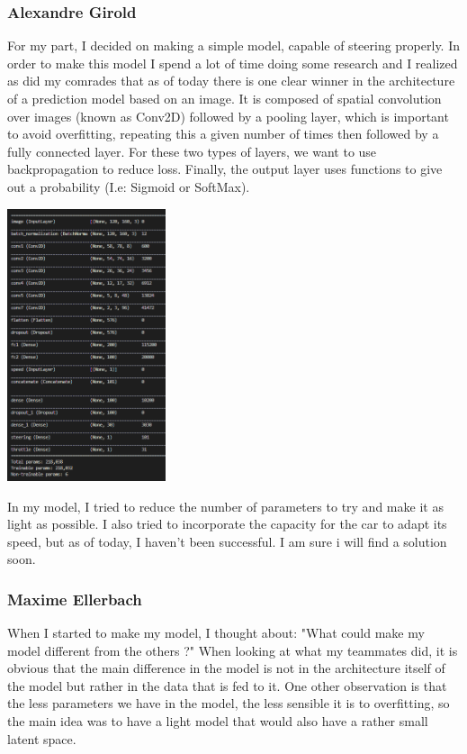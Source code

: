 \documentclass[12pt]{article}
\begin{document}
\subsubsection{Alexandre Girold}
For my part, I decided on making a simple model, capable of steering properly. In order to make this model I spend a lot of time doing some research and I realized as did my comrades that as of today there is one clear winner in the architecture of a prediction model based on an image. 
It is composed of spatial convolution over images (known as Conv2D) followed by a pooling layer, which is important to avoid overfitting, repeating this a given number of times then followed by a fully connected layer. For these two types of layers, we want to use backpropagation to reduce loss. Finally, the output layer uses functions to give out a probability (I.e: Sigmoid or SoftMax).  

\centerline{\includegraphics[height=8cm]{../../docs/model-sacha.png}}
 
In my model, I tried to reduce the number of parameters to try and make it as light as possible. I also tried to incorporate the capacity for the car to adapt its speed, but as of today, I haven’t been successful. I am sure i will find a solution soon.

\subsubsection{Maxime Ellerbach}
When I started to make my model, I thought about: "What could make my model different from the others ?" When looking at what my teammates did, it is obvious that the main difference in the model is not in the architecture itself of the model but rather in the data that is fed to it. One other observation is that the less parameters we have in the model, the less sensible it is to overfitting, so the main idea was to have a light model that would also have a rather small latent space. \\
\end{document}
